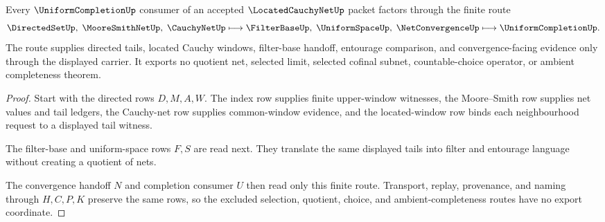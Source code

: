 \begin{theorem}
\label{thm:located-cauchy-net-uniform-completion-route}
Every $\UniformCompletionUp$ consumer of an accepted $\LocatedCauchyNetUp$ packet factors through the finite route
$$
\DirectedSetUp,\;\MooreSmithNetUp,\;\CauchyNetUp
\longmapsto
\FilterBaseUp,\;\UniformSpaceUp,\;\NetConvergenceUp
\longmapsto
\UniformCompletionUp .
$$
The route supplies directed tails, located Cauchy windows, filter-base handoff, entourage comparison, and convergence-facing evidence only through the displayed carrier. It exports no quotient net, selected limit, selected cofinal subnet, countable-choice operator, or ambient completeness theorem.
\end{theorem}
\begin{proof}
Start with the directed rows $D,M,A,W$. The index row supplies finite upper-window witnesses, the Moore--Smith row supplies net values and tail ledgers, the Cauchy-net row supplies common-window evidence, and the located-window row binds each neighbourhood request to a displayed tail witness.

The filter-base and uniform-space rows $F,S$ are read next. They translate the same displayed tails into filter and entourage language without creating a quotient of nets.

The convergence handoff $N$ and completion consumer $U$ then read only this finite route. Transport, replay, provenance, and naming through $H,C,P,K$ preserve the same rows, so the excluded selection, quotient, choice, and ambient-completeness routes have no export coordinate.
\end{proof}


\begin{closurestatus}{\LocatedCauchyNetUp}
  \theoryclosure{\scopedClosure}
  \formalstatus{\theoremCheckedV}
\end{closurestatus}
